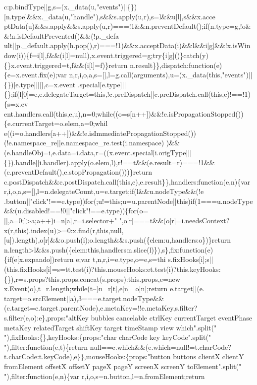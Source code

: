\begin{DoxyCode}
{      c:p.bindType||g,s=(x.\_data(u,"events")||\{\})[n.type]&&x.\_data(u,"handle"),s&&s.apply(u,r),s=l&&u[l],s&&x.acce
      ptData(u)&&s.apply&&s.apply(u,r)===!1&&n.preventDefault();if(n.type=g,!o&&!n.isDefaultPrevented()&&(!p.\_defa
      ult||p.\_default.apply(h.pop(),r)===!1)&&x.acceptData(i)&&l&&i[g]&&!x.isWindow(i))\{f=i[l],f&&(i[l]=null),x.event.triggered=g;try\{i[g]()\}catch(y)\{\}x.event.triggered=t,f&&(i[l]=f)\}return
       n.result\}\},dispatch:function(e)\{e=x.event.fix(e);var
       n,r,i,o,a,s=[],l=g.call(arguments),u=(x.\_data(this,"events")||\{\})[e.type]||[],c=x.event
      .special[e.type]||\{\};if(l[0]=e,e.delegateTarget=this,!c.preDispatch||c.preDispatch.call(this,e)!==!1)\{s=x.ev
      ent.handlers.call(this,e,u),n=0;while((o=s[n++])&&!e.isPropagationStopped())\{e.currentTarget=o.elem,a=0;whil
      e((i=o.handlers[a++])&&!e.isImmediatePropagationStopped())(!e.namespace\_re||e.namespace\_re.test(i.namespace)
      )&&(e.handleObj=i,e.data=i.data,r=((x.event.special[i.origType]||\{\}).handle||i.handler).apply(o.elem,l),r!==t&&(e.result=r)===!1&&(e.preventDefault(),e.stopPropagation()))\}return
       c.postDispatch&&c.postDispatch.call(this,e),e.result\}\},handlers:function(e,n)\{var
       r,i,o,a,s=[],l=n.delegateCount,u=e.target;if(l&&u.nodeType&&(!e
      .button||"click"!==e.type))for(;u!=this;u=u.parentNode||this)if(1===u.nodeType&&(u.disabled!==!0||"click"!==e.type))\{for(o=[],a=0;l>a;a++)i=n[a],r=i.selector+"
       ",o[r]===t&&(o[r]=i.needsContext?x(r,this).index(u)>=0:x.find(r,this,null,[u]).length),o[r]&&o.push(i);o.length&&s.push(\{elem:u,handlers:o\})\}return
       n.length>l&&s.push(\{elem:this,handlers:n.slice(l)\}),s\},fix:function(e)\{if(e[x.expando])return e;var
       t,n,r,i=e.type,o=e,s=thi
      s.fixHooks[i];s||(this.fixHooks[i]=s=tt.test(i)?this.mouseHooks:et.test(i)?this.keyHooks:\{\}),r=s.props?this.props.concat(s.props):this.props,e=new x.Event(o),t=r.length;while(t--)n=r[t],e[n]=o[n];return
       e.target||(e.
      target=o.srcElement||a),3===e.target.nodeType&&(e.target=e.target.parentNode),e.metaKey=!!e.metaKey,s.filter?s.filter(e,o):e\},props:"altKey bubbles cancelable ctrlKey currentTarget eventPhase metaKey relatedTarget
       shiftKey target timeStamp view which".split(" "),fixHooks:\{\},keyHooks:\{props:"char charCode key
       keyCode".split(" "),filter:function(e,t)\{return
       null==e.which&&(e.which=null!=t.charCode?t.charCode:t.keyCode),e\}\},mouseHooks:\{props:"button buttons clientX clientY fromElement offsetX offsetY pageX pageY screenX screenY
       toElement".split(" "),filter:function(e,n)\{var r,i,o,s=n.button,l=n.fromElement;return
}
\end{DoxyCode}
